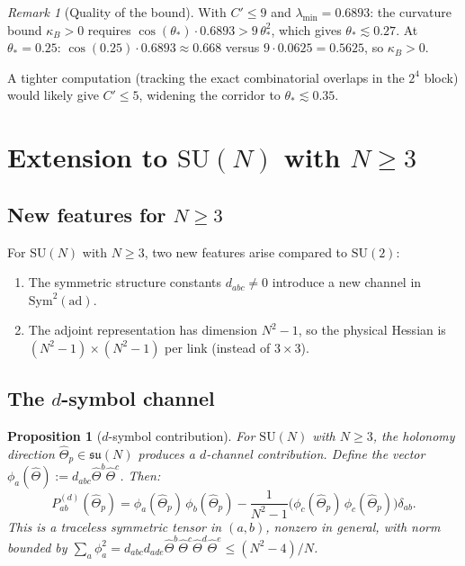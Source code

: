 \documentclass[11pt,a4paper]{article}
\theoremstyle{plain}
\newtheorem{proposition}[theorem]{Proposition}
\theoremstyle{definition}
\theoremstyle{remark}
\newtheorem{remark}[theorem]{Remark}
\newcommand{\SU}{\mathrm{SU}}
\newcommand{\su}{\mathfrak{su}}
\newcommand{\ad}{\mathrm{ad}}
\newcommand{\Sym}{\mathrm{Sym}}
\begin{document}
\begin{remark}[Quality of the bound]
With $C' \leq 9$ and $\lambda_{\min} = 0.6893$: the curvature
bound $\kappa_B > 0$ requires
$\cos(\theta_*)\cdot 0.6893 > 9\,\theta_*^2$, which gives
$\theta_* \lesssim 0.27$. At $\theta_* = 0.25$:
$\cos(0.25)\cdot 0.6893 \approx 0.668$ versus
$9 \cdot 0.0625 = 0.5625$, so $\kappa_B > 0$.

A tighter computation (tracking the exact combinatorial overlaps
in the $2^4$ block) would likely give $C' \leq 5$, widening the
corridor to $\theta_* \lesssim 0.35$.
\end{remark}


\section{Extension to $\SU(N)$ with $N \geq 3$}\label{sec:suN}

\subsection{New features for $N \geq 3$}

For $\SU(N)$ with $N \geq 3$, two new features arise compared to
$\SU(2)$:
\begin{enumerate}[label=(\alph*)]
\item The symmetric structure constants $d_{abc} \neq 0$
  introduce a new channel in $\Sym^2(\ad)$.
\item The adjoint representation has dimension $N^2 - 1$, so the
  physical Hessian is $(N^2-1) \times (N^2-1)$ per link (instead
  of $3 \times 3$).
\end{enumerate}


\subsection{The $d$-symbol channel}

\begin{proposition}[$d$-symbol contribution]\label{prop:d-channel}
For $\SU(N)$ with $N \geq 3$, the holonomy direction
$\hat\Theta_p \in \su(N)$ produces a $d$-channel contribution.
Define the vector $\phi_a(\hat\Theta) := d_{abc}\hat\Theta^b\hat\Theta^c$.
Then:
\begin{equation}
P^{(d)}_{ab}(\hat\Theta_p)
= \phi_a(\hat\Theta_p)\,\phi_b(\hat\Theta_p)
- \frac{1}{N^2-1}\bigl(\phi_c(\hat\Theta_p)\,
\phi_c(\hat\Theta_p)\bigr)\delta_{ab}.
\end{equation}
This is a traceless symmetric tensor in $(a,b)$, nonzero in general,
with norm bounded by
$\sum_a \phi_a^2 = d_{abc}d_{ade}\hat\Theta^b\hat\Theta^c
\hat\Theta^d\hat\Theta^e \leq (N^2-4)/N$.
\end{proposition}
\end{document}
